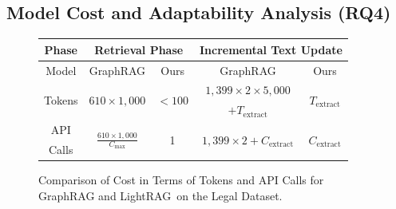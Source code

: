 \documentclass{article} %
\def\model{LightRAG}
\begin{document}
\vspace{-0.05in}
\subsection{Model Cost and Adaptability Analysis (RQ4)}
\vspace{-0.05in}

\begin{figure}
    \vspace{-0.18in}
    \centering
    \caption{Comparison of Cost in Terms of Tokens and API Calls for GraphRAG and \model\ on the Legal Dataset.}
    \vspace{-0.1in}
    \label{tab:cost}
    \centering
    \scriptsize
    \setlength{\tabcolsep}{0.3mm}
    \begin{tabular}{|c|c|c|c|c|}
        \hline
        Phase & \multicolumn{2}{c|}{Retrieval Phase} & \multicolumn{2}{c|}{Incremental Text Update} \\ \hline
        Model & GraphRAG & Ours & GraphRAG & Ours \\ \hline
        \multirow{2}{*}{Tokens} & \multirow{2}{*}{$610 \times 1{,}000$} & \multirow{2}{*}{$< 100$} & $1{,}399 \times 2 \times 5{,}000$ & \multirow{2}{*}{$T_{\text{extract}}$} \\ 
        &&&$+ T_{\text{extract}}$& \\
        \hline
        API & \multirow{2}{*}{$\frac{610 \times 1{,}000}{C_{\text{max}}}$} & \multirow{2}{*}{1} & \multirow{2}{*}{$1{,}399 \times 2 + C_{\text{extract}}$} & \multirow{2}{*}{$C_{\text{extract}}$}\\
        Calls & &&&\\\hline
    \end{tabular}
    \vspace{-0.15in}
\end{figure}
\end{document}
